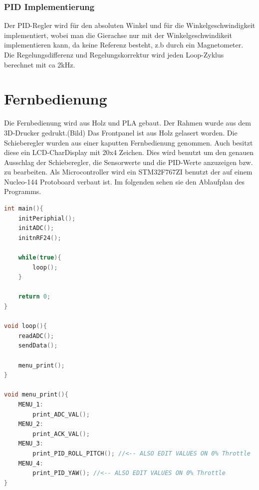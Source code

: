 \documentclass[12pt,a4paper, ngerman]{article}
\begin{document}
\subsubsection{PID Implementierung}
Der PID-Regler wird für den absoluten Winkel und für die Winkelgeschwindigkeit implementiert, wobei man die Gierachse nur mit der Winkelgeschwindikeit implementieren kann, da keine Referenz besteht, z.b durch ein Magnetometer. Die Regelungsdifferenz und Regelungskorrektur wird jeden Loop-Zyklus berechnet mit ca 2kHz.

\section{Fernbedienung}
Die Fernbedienung wird aus Holz und PLA gebaut. Der Rahmen wurde aus dem 3D-Drucker gedrukt.(Bild) Das Frontpanel ist aus Holz gelasert worden. Die Schieberegler wurden aus einer kaputten Fernbedienung genommen. Auch besitzt diese ein LCD-CharDisplay mit 20x4 Zeichen. Dies wird benutzt um den genauen Ausschlag der Schieberegler, die Sensorwerte und die PID-Werte anzuzeigen bzw. zu bearbeiten. Als Microcontroller wird ein STM32F767ZI benutzt der auf einem Nucleo-144 Protoboard verbaut ist. Im folgenden sehen sie den Ablaufplan des Programms.
\begin{lstlisting}[language=C++,caption=Programmablauf Pseudocode]
int main(){
	initPeriphial();
	initADC();
	initnRF24();

	while(true){
		loop();
	}
	
	return 0;
}

void loop(){
	readADC();
	sendData();
	
	menu_print();
}

void menu_print(){
	MENU_1:
		print_ADC_VAL();
	MENU_2:
		print_ACK_VAL();
	MENU_3:
		print_PID_ROLL_PITCH(); //<-- ALSO EDIT VALUES ON 0% Throttle
	MENU_4:
		print_PID_YAW(); //<-- ALSO EDIT VALUES ON 0% Throttle
}


\end{lstlisting}
\newpage
\end{document}
